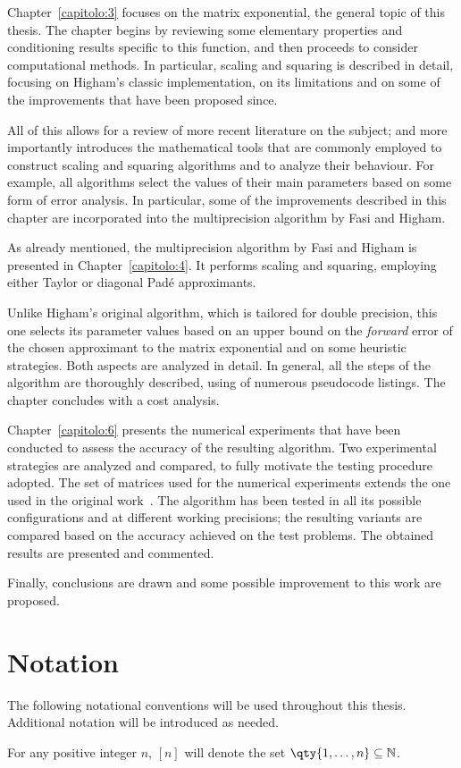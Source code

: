 Chapter~\ref{capitolo:3} focuses on the matrix exponential, the general topic of this thesis. The chapter begins by reviewing some elementary properties and conditioning results specific to this function, and then proceeds to consider computational methods. In particular, scaling and squaring is described in detail, focusing on Higham's classic implementation, on its limitations and on some of the improvements that have been proposed since. 

All of this allows for a review of more recent literature on the subject; and more importantly introduces the mathematical tools that are commonly employed to construct scaling and squaring algorithms and to analyze their behaviour. For example, all algorithms select the values of their main parameters based on some form of error analysis. In particular, some of the improvements described in this chapter are incorporated into the multiprecision algorithm by Fasi and Higham.
\smallskip 

As already mentioned, the multiprecision algorithm by Fasi and Higham is presented in Chapter~\ref{capitolo:4}. It performs scaling and squaring, employing either Taylor or diagonal Padé approximants. 

Unlike Higham's original algorithm, which is tailored for double precision, this one selects its parameter values based on an upper bound on the \emph{forward} error of the chosen approximant to the matrix exponential and on some heuristic strategies. Both aspects are analyzed in detail. In general, all the steps of the algorithm are thoroughly described, using of numerous pseudocode listings. The chapter concludes with a cost analysis.
\smallskip 

Chapter~\ref{capitolo:6} presents the numerical experiments that have been conducted to assess the accuracy of the resulting algorithm. Two experimental strategies are analyzed and compared, to fully motivate the testing procedure adopted. The set of matrices used for the numerical experiments extends the one used in the original work~\cite{higham:hf19_mpexpm}. 
The algorithm has been tested in all its possible configurations and at different working precisions; the resulting variants are compared based on the accuracy achieved on the test problems. The obtained results are presented and commented. 
\smallskip 

Finally, conclusions are drawn and some possible improvement to this work are proposed.

\newpage 

\section*{Notation}
The following notational conventions will be used throughout this thesis. Additional notation will be introduced as needed.
\begin{notazione*}
	For any positive integer $n$, $[n]$ will denote the set $\qty{1,\dots,n}\subseteq\mathbb{N}$.
\end{notazione*}
\smallskip

